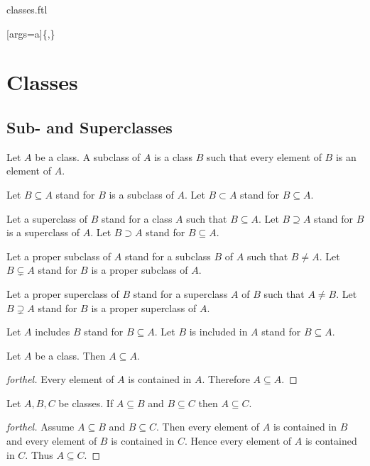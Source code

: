 \documentclass{naproche-library}
\begin{document}
\begin{smodule}{classes.ftl}
  
  [args=a]{\{,\}}

  \section*{Classes}

  \subsection*{Sub- and Superclasses}

  \begin{definition}[forthel,id=FOUNDATIONS_01_3275578358628352,printid]
    Let $A$ be a class.
    A subclass of $A$ is a class $B$ such that every element of $B$ is an
    element of $A$.

    Let $B \subseteq A$ stand for $B$ is a subclass of $A$.
    Let $B \subset A$ stand for $B \subseteq A$.

    Let a superclass of $B$ stand for a class $A$ such that $B \subseteq A$.
    Let $B \supseteq A$ stand for $B$ is a superclass of $A$.
    Let $B \supset A$ stand for $B \subseteq A$.

    Let a proper subclass of $A$ stand for a subclass $B$ of $A$ such that $B \neq A$.
    Let $B \subsetneq A$ stand for $B$ is a proper subclass of $A$.

    Let a proper superclass of $B$ stand for a superclass $A$ of $B$ such that $A \neq B$.
    Let $B \supsetneq A$ stand for $B$ is a proper superclass of $A$.

    Let $A$ includes $B$ stand for $B \subseteq A$.
    Let $B$ is included in $A$ stand for $B \subseteq A$.
  \end{definition}

  \begin{proposition}[forthel,id=FOUNDATIONS_01_5994555614691328,printid]
    Let $A$ be a class.
    Then $A \subseteq A$.
  \end{proposition}
  \begin{proof}[forthel]
    Every element of $A$ is contained in $A$.
    Therefore $A \subseteq A$.
  \end{proof}

  \begin{proposition}[forthel,id=FOUNDATIONS_01_3939677545431040,printid]
    Let $A, B, C$ be classes.
    If $A \subseteq B$ and $B \subseteq C$ then $A \subseteq C$.
  \end{proposition}
  \begin{proof}[forthel]
    Assume $A \subseteq B$ and $B \subseteq C$.
    Then every element of $A$ is contained in $B$ and every element of $B$ is contained in $C$.
    Hence every element of $A$ is contained in $C$.
    Thus $A \subseteq C$.
  \end{proof}


\end{smodule}
\end{document}

